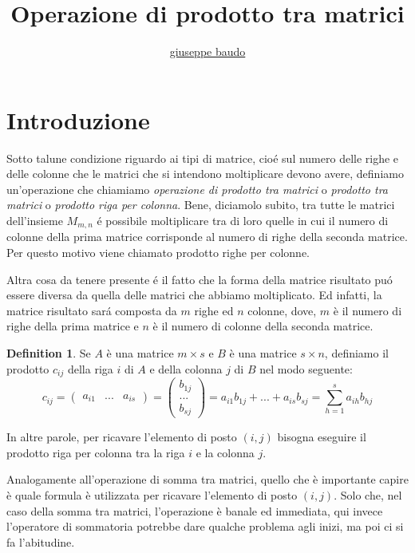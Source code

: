 \documentclass[a4paper,10pt]{article}
\title{Operazione di prodotto tra matrici}
\author{\href{http://www.baudo.hol.es}{giuseppe baudo}}
\begin{document}
	
	\theoremstyle{definition}
	\newtheorem{definition}{Definition}[section]

\maketitle

\section{Introduzione}
Sotto talune condizione riguardo ai tipi di matrice, cio\'{e} sul numero delle righe e delle colonne che le matrici che si intendono moltiplicare devono avere, definiamo un'operazione
che chiamiamo \textit{operazione di prodotto tra matrici} o \textit{prodotto tra matrici} o \textit{prodotto riga per colonna}.
Bene, diciamolo subito, tra tutte le matrici dell'insieme $M_{m,n}$ \'{e} possibile moltiplicare tra di loro quelle in cui il numero di colonne della prima matrice corrisponde al
numero di righe della seconda matrice. Per questo motivo viene chiamato prodotto righe per colonne.

Altra cosa da tenere presente \'{e} il fatto che la forma della matrice risultato pu\'{o} essere diversa da quella delle matrici che abbiamo moltiplicato. Ed infatti, la matrice risultato
sar\'{a} composta da $m$ righe ed $n$ colonne, dove, $m$ \`{e} il numero di righe della prima matrice e $n$ \`{e} il numero di colonne della seconda matrice.

\begin{definition}
 Se $A$ \`{e} una matrice $m \times s$ e $B$ \`{e} una matrice $s \times n$, definiamo il prodotto $c_{ij}$ della riga $i$ di $A$ e della colonna $j$ di $B$ nel modo seguente:
 \[
  c_{ij} = \begin{pmatrix}
	      a_{i1} & ... & a_{is}
           \end{pmatrix}           
         = \begin{pmatrix}
	      b_{1j} \\
	      ... \\
	      b_{sj}
           \end{pmatrix}
         = a_{i1}b_{1j} + ... + a_{is}b_{sj}
         = \sum_{h=1}^s a_{ih}b_{hj}
 \]

\end{definition}

In altre parole, per ricavare l'elemento di posto $(i,j)$ bisogna eseguire il prodotto riga per colonna tra la riga $i$ e la colonna $j$.

Analogamente all'operazione di somma tra matrici, quello che \`{e} importante capire \`{e} quale formula \`{e} utilizzata per ricavare l'elemento di posto $(i,j)$. Solo che,
nel caso della somma tra matrici, l'operazione \`{e} banale ed immediata, qui invece l'operatore di sommatoria potrebbe dare qualche problema agli inizi, ma poi ci si fa l'abitudine.
\end{document}
